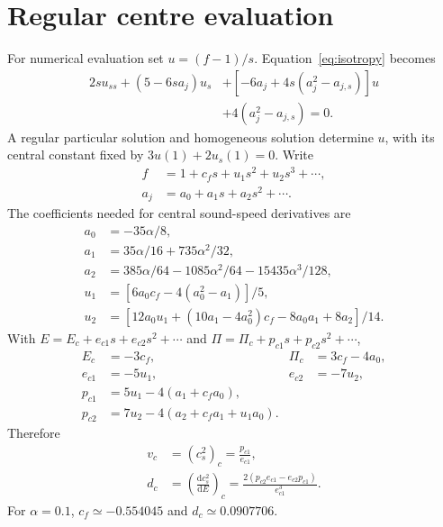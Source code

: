 \documentclass[journal,a4paper]{IEEEtran}
\newcommand{\dd}{\mathrm d}
\begin{document}
\ifdefined\appendices\appendices\else\appendix\fi
\section{Regular centre evaluation}
\label{app:centre}
For numerical evaluation set $u=(f-1)/s$. Equation~\eqref{eq:isotropy} becomes
\begin{align}
 2s u_{ss}+(5-6sa_j)u_s
 &+[-6a_j+4s(a_j^2-a_{j,s})]u\nonumber\\
 &+4(a_j^2-a_{j,s})=0.
\end{align}
A regular particular solution and homogeneous solution determine $u$, with its central constant fixed by $3u(1)+2u_s(1)=0$. Write
\begin{align}
 f&=1+c_f s+u_1s^2+u_2s^3+\cdots,\nonumber\\
 a_j&=a_0+a_1s+a_2s^2+\cdots.
\end{align}
The coefficients needed for central sound-speed derivatives are
\begin{align}
 a_0&=-35\alpha/8,\nonumber\\
 a_1&=35\alpha/16+735\alpha^2/32,\nonumber\\
 a_2&=385\alpha/64-1085\alpha^2/64-15435\alpha^3/128,\\
 u_1&=[6a_0c_f-4(a_0^2-a_1)]/5,\nonumber\\
 u_2&=[12a_0u_1+(10a_1-4a_0^2)c_f-8a_0a_1+8a_2]/14.
\end{align}
With $E=E_c+e_{c1}s+e_{c2}s^2+\cdots$ and $\Pi=\Pi_c+p_{c1}s+p_{c2}s^2+\cdots$,
\begin{align}
 E_c&=-3c_f,&\Pi_c&=3c_f-4a_0,\nonumber\\
 e_{c1}&=-5u_1,&e_{c2}&=-7u_2,\nonumber\\
 p_{c1}&=5u_1-4(a_1+c_fa_0),\nonumber\\
 p_{c2}&=7u_2-4(a_2+c_fa_1+u_1a_0).
\end{align}
Therefore
\begin{align}
 v_c&=(c_s^2)_c=\frac{p_{c1}}{e_{c1}},\nonumber\\
 d_c&=\left(\frac{\dd c_s^2}{\dd E}\right)_c
     =\frac{2(p_{c2}e_{c1}-e_{c2}p_{c1})}{e_{c1}^3}.
\end{align}
For $\alpha=0.1$, $c_f\simeq-0.554045$ and $d_c\simeq0.0907706$.
\end{document}

